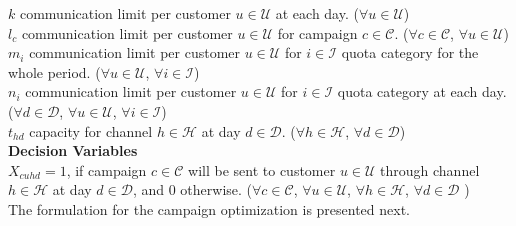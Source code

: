 \documentclass[11pt]{article}
\begin{document}
\noindent $k$ communication limit per customer $u \in \mathcal{U}$ at each day.
($\forall u \in \mathcal{U}$)\\

\noindent $l_{c}$ communication limit per customer $u \in \mathcal{U}$ for campaign $c \in \mathcal{C}$.
($\forall c \in \mathcal{C}$, $\forall u \in \mathcal{U}$)\\

\noindent $m_{i}$ communication limit per customer $u \in \mathcal{U}$ for $i \in \mathcal{I}$ quota category for the whole period.
($\forall u \in \mathcal{U}$, $\forall i \in \mathcal{I}$)\\

\noindent $n_{i}$ communication limit per customer $u \in \mathcal{U}$ for $i \in \mathcal{I}$ quota category at each day.
($\forall d \in \mathcal{D}$, $\forall u \in \mathcal{U}$, $\forall i \in \mathcal{I}$)\\

\noindent $t_{{h}{d}}$ capacity for channel $h \in \mathcal{H}$ at day $d \in \mathcal{D}$.
($\forall h \in \mathcal{H}$, $\forall d \in \mathcal{D}$)\\

\noindent \textbf{Decision Variables}\\
$X_{{c}{u}{h}{d}}=1$, if campaign $c \in \mathcal{C}$ will be sent to customer $u \in \mathcal{U}$ through channel $h \in \mathcal{H}$ at day $d \in \mathcal{D}$, and 0 otherwise.
($\forall c \in \mathcal{C}$, $\forall u \in \mathcal{U}$, $\forall h \in \mathcal{H}$, $\forall d \in \mathcal{D}$ )\\

\noindent The formulation for the campaign optimization is presented next.
\end{document}

